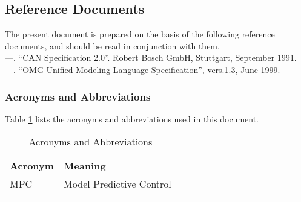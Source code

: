 \documentclass[MTRX3700report.tex]{subfiles}
\begin{document}
\subsection{Reference Documents}
  The present document is prepared on the basis of the following reference documents, and should be read in conjunction with them.\\
  —.  “CAN Specification 2.0”.  Robert Bosch GmbH, Stuttgart, September 1991.\\
  —.  “OMG Unified Modeling Language Specification”, vers.1.3, June 1999.

\subsubsection{Acronyms and Abbreviations}
  Table \ref{Acro} lists the acronyms and abbreviations used in this document.
  \begin{table}[h]
  \centering
  \caption{Acronyms and Abbreviations}
  \label{Acro}
  \begin{tabular}{|l|l|}
  \hline Acronym & Meaning \\
  \hline MPC & Model Predictive Control \\
  \hline & \\
  \hline
  \end{tabular}
  \end{table}
\end{document}
